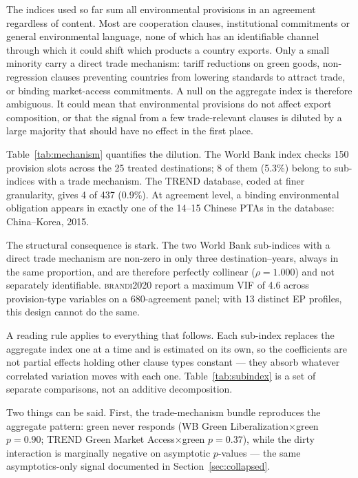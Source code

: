 \documentclass[11pt]{article}
\newcommand{\citet}[1]{\textsc{#1}}
\begin{document}
The indices used so far sum all environmental provisions in an agreement regardless of content.
Most are cooperation clauses, institutional commitments or general environmental language, none of
which has an identifiable channel through which it could shift which products a country exports.
Only a small minority carry a direct trade mechanism: tariff reductions on green goods,
non-regression clauses preventing countries from lowering standards to attract trade, or binding
market-access commitments. A null on the aggregate index is therefore ambiguous. It could mean that
environmental provisions do not affect export composition, or that the signal from a few
trade-relevant clauses is diluted by a large majority that should have no effect in the first place.

Table~\ref{tab:mechanism} quantifies the dilution. The World Bank index checks 150 provision slots
across the 25 treated destinations; 8 of them (5.3\%) belong to sub-indices with a trade mechanism.
The TREND database, coded at finer granularity, gives 4 of 437 (0.9\%). At agreement level, a
binding environmental obligation appears in exactly one of the 14--15 Chinese PTAs in the database:
China--Korea, 2015.



The structural consequence is stark. The two World Bank sub-indices with a direct trade mechanism
are non-zero in only three destination--years, always in the same proportion, and are therefore
perfectly collinear ($\rho = 1.000$) and not separately identifiable. \citet{brandi2020} report a
maximum VIF of 4.6 across provision-type variables on a 680-agreement panel; with 13 distinct EP
profiles, this design cannot do the same.

A reading rule applies to everything that follows. Each sub-index replaces the aggregate index one
at a time and is estimated on its own, so the coefficients are not partial effects holding other
clause types constant --- they absorb whatever correlated variation moves with each one.
Table~\ref{tab:subindex} is a set of separate comparisons, not an additive decomposition.

Two things can be said. First, the trade-mechanism bundle reproduces the aggregate pattern: green
never responds (WB Green Liberalization$\times$green $p = 0.90$; TREND Green Market
Access$\times$green $p = 0.37$), while the dirty interaction is marginally negative on asymptotic
$p$-values --- the same asymptotics-only signal documented in Section~\ref{sec:collapsed}.
\end{document}
